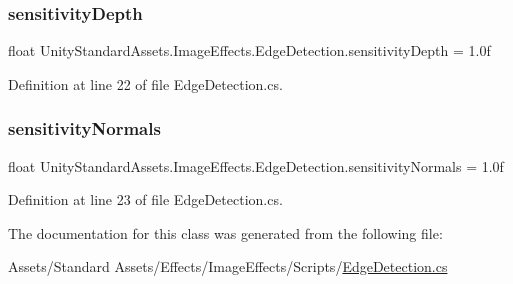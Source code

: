 \subsubsection{\texorpdfstring{sensitivity\+Depth}{sensitivityDepth}}
{\footnotesize\ttfamily float Unity\+Standard\+Assets.\+Image\+Effects.\+Edge\+Detection.\+sensitivity\+Depth = 1.\+0f}



Definition at line 22 of file Edge\+Detection.\+cs.

\mbox{\label{class_unity_standard_assets_1_1_image_effects_1_1_edge_detection_abcada6169dbaee43b868d7ca30c200eb}} 
\subsubsection{\texorpdfstring{sensitivity\+Normals}{sensitivityNormals}}
{\footnotesize\ttfamily float Unity\+Standard\+Assets.\+Image\+Effects.\+Edge\+Detection.\+sensitivity\+Normals = 1.\+0f}



Definition at line 23 of file Edge\+Detection.\+cs.



The documentation for this class was generated from the following file\+:\begin{DoxyCompactItemize}
\item 
Assets/\+Standard Assets/\+Effects/\+Image\+Effects/\+Scripts/\mbox{\hyperlink{_edge_detection_8cs}{Edge\+Detection.\+cs}}\end{DoxyCompactItemize}
